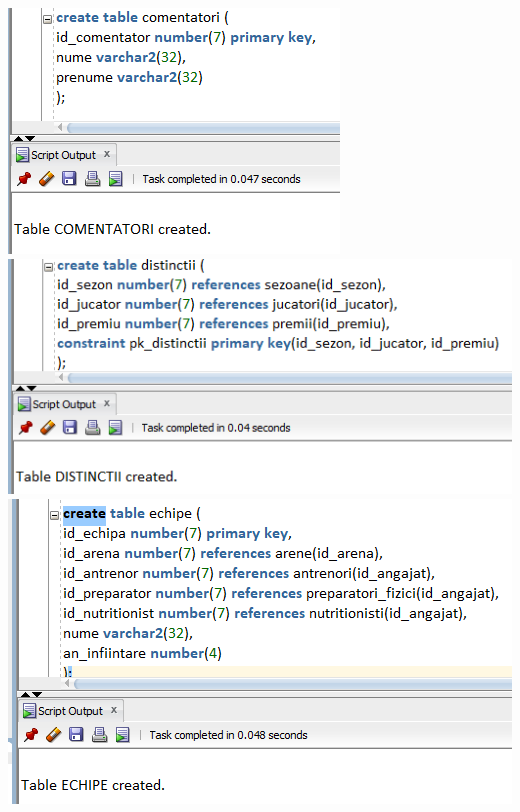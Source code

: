 \documentclass{article}
\begin{document}
\begin{multicols*}{4}
\vspace{4em}
\includegraphics[width=\linewidth]{creation/comentatori}
\vspace{4em}
\includegraphics[width=\linewidth]{creation/distinctii}
\vspace{4em}
\includegraphics[width=\linewidth]{creation/echipe}

\end{multicols*}
\end{document}
